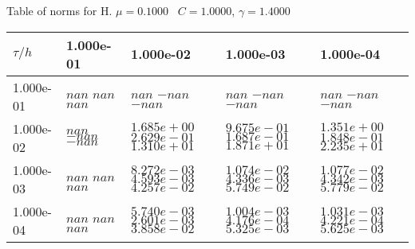 \begin{center}
Table of norms for H. $\mu = 0.1000$ \, $C = 1.0000$, $\gamma = 1.4000$
  
\begin{tabular}{|p{1in}|p{1in}|p{1in}|p{1in}|p{1in}|} \hline
$\tau / h$ &1.000e-01 &1.000e-02 &1.000e-03 &1.000e-04 \\ \hline 
1.000e-01 & $nan$  $nan$  $nan$  & $nan$  $-nan$  $-nan$  & $nan$  $-nan$  $-nan$  & $nan$  $-nan$  $-nan$  \\ \hline 
1.000e-02 & $nan$  $-nan$  $-nan$  & $1.685e+00$  $2.629e-01$  $1.310e+01$  & $9.675e-01$  $1.687e-01$  $1.871e+01$  & $1.351e+00$  $1.848e-01$  $2.235e+01$  \\ \hline 
1.000e-03 & $nan$  $nan$  $nan$  & $8.272e-03$  $4.593e-03$  $4.257e-02$  & $1.074e-02$  $4.336e-03$  $5.749e-02$  & $1.077e-02$  $4.342e-03$  $5.779e-02$  \\ \hline 
1.000e-04 & $nan$  $nan$  $nan$  & $5.740e-03$  $2.601e-03$  $3.858e-02$  & $1.004e-03$  $4.176e-04$  $5.325e-03$  & $1.031e-03$  $4.221e-04$  $5.625e-03$  \\ \hline 

\end{tabular}\\[20pt]
\end{center}
